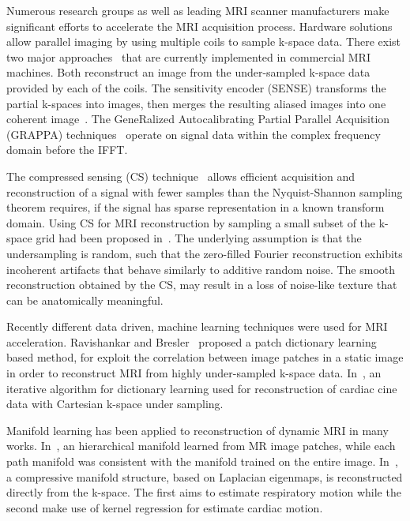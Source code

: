 \documentclass[review]{elsarticle}
\begin{document}
Numerous research groups as well as leading MRI scanner manufacturers make significant efforts to accelerate the MRI acquisition process. Hardware solutions allow parallel imaging by using multiple coils \cite{roemer1990nmr} to sample k-space data. There exist two major approaches~\cite{Deshmane2012} that are currently implemented in commercial MRI machines. Both reconstruct an image from the under-sampled k-space data provided by each of the coils. The sensitivity encoder (SENSE) transforms the partial k-spaces into images, then merges the resulting aliased images into one coherent image~\cite{pruessmann1999sense}. 
The GeneRalized Autocalibrating Partial Parallel Acquisition (GRAPPA) techniques~\cite{griswold2002generalized} operate on signal data within the complex frequency domain before the IFFT.

The compressed sensing (CS) technique~\cite{donoho2006compressed} allows efficient acquisition and reconstruction of a signal with fewer samples than the Nyquist-Shannon sampling theorem requires, if the signal has sparse representation in a known transform domain. Using CS for MRI reconstruction by sampling a small subset of the k-space grid had been proposed in~\cite{lustig2007sparse}. The underlying assumption is that the undersampling is random, such that the zero-filled Fourier reconstruction exhibits incoherent artifacts that behave similarly to additive random noise. 
The smooth reconstruction obtained by the CS, may result in a loss of noise-like texture that can be anatomically meaningful.
 


Recently different data driven, machine learning techniques were used for MRI acceleration. 
Ravishankar and Bresler~\cite{ravishankar2011mr} proposed a patch dictionary learning based method, for exploit the correlation between image patches in a static image in order to reconstruct MRI from highly under-sampled k-space data. In~\cite{caballero2014dictionary}, an iterative algorithm for dictionary learning used for reconstruction of cardiac cine data with Cartesian k-space under sampling.

Manifold learning has been applied to reconstruction of dynamic MRI in many works. In~\cite{bhatia2014hierarchical}, an hierarchical manifold learned from MR image patches, while each path manifold was consistent with the manifold trained on the entire image. In~\cite{usman2014compressive, bhatia2015fast}, a compressive manifold structure, based on Laplacian eigenmaps, is reconstructed directly from the k-space. The first aims to estimate respiratory motion while the second make use of kernel regression for estimate cardiac motion.
\end{document}
